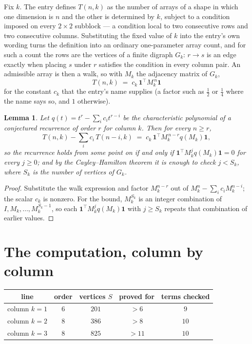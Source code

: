 \documentclass[11pt,a4paper]{article}
\theoremstyle{plain}
\newtheorem{lemma}[theorem]{Lemma}
\theoremstyle{definition}
\begin{document}
Fix $k$. The entry defines $T(n,k)$ as the number of arrays of a shape in which one dimension
is $n$ and the other is determined by $k$, subject to a condition imposed on every
$2\times2$ subblock --- a condition local to two consecutive rows and two consecutive columns.
Substituting the fixed value of $k$ into the entry's own wording turns the definition into an
ordinary one-parameter array count, and for such a count the rows are the vertices of a finite
digraph $G_k$: $r\to s$ is an edge exactly when placing $s$ under $r$ satisfies the condition
in every column pair. An admissible array is then a walk, so with $M_k$ the adjacency matrix
of $G_k$,
\[
T(n,k)\;=\;c_k\,\mathbf{1}^{\!\top}M_k^{\,n}\mathbf{1}
\]
for the constant $c_k$ that the entry's name supplies (a factor such as $\tfrac12$ or
$\tfrac14$ where the name says so, and $1$ otherwise).

\begin{lemma}\label{lem:crit}
Let $q(t)=t^{r}-\sum_i c_it^{r-i}$ be the characteristic polynomial of a conjectured
recurrence of order $r$ for column $k$. Then for every $n\ge r$,
\[
T(n,k)-\sum_i c_i\,T(n-i,k)\;=\;c_k\,\mathbf{1}^{\!\top}M_k^{\,n-r}q(M_k)\mathbf{1},
\]
so the recurrence holds from some point on if and only if
$\mathbf{1}^{\!\top}M_k^{j}q(M_k)\mathbf{1}=0$ for every $j\ge0$; and by the
Cayley--Hamilton theorem it is enough to check $j<S_k$, where $S_k$ is the number of vertices
of $G_k$.
\end{lemma}

\begin{proof}
Substitute the walk expression and factor $M_k^{n-r}$ out of $M_k^{n}-\sum_ic_iM_k^{n-i}$;
the scalar $c_k$ is nonzero. For the bound, $M_k^{S_k}$ is an integer combination of
$I,M_k,\dots,M_k^{S_k-1}$, so each $\mathbf{1}^{\!\top}M_k^{j}q(M_k)\mathbf{1}$ with
$j\ge S_k$ repeats that combination of earlier values.
\end{proof}

\section{The computation, column by column}

\begin{center}
\begin{tabular}{ccccc}
line & order & vertices $S$ & proved for & terms checked \\ \hline
column $k$$=1$ & $6$ & $201$ & $>6$ & $9$ \\
column $k$$=2$ & $8$ & $386$ & $>8$ & $10$ \\
column $k$$=3$ & $8$ & $825$ & $>11$ & $10$ \\
\end{tabular}
\end{center}
\end{document}
